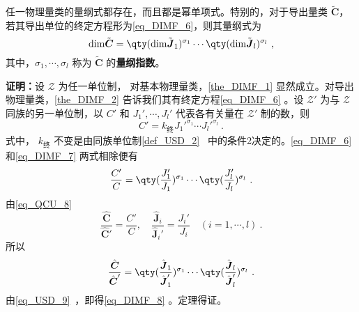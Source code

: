 \begin{theorem}{}\label{the_DIMF_1}
任一物理量类的量纲式都存在，而且都是幂单项式。特别的，对于导出量类 $\tilde{\boldsymbol{C}}$，若其导出单位的终定方程形为\autoref{eq_DIMF_6}，则其量纲式为
\begin{equation}\label{eq_DIMF_8}
\mathrm{dim}\tilde{\boldsymbol{C}}=\qty(\mathrm{dim}\tilde{\boldsymbol{J}}_1)^{\sigma_1}\cdots\qty(\mathrm{dim}\tilde{\boldsymbol{J}}_l)^{\sigma_l}~,
\end{equation}
其中，$\sigma_1,\cdots,\sigma_l$ 称为 $\tilde{\boldsymbol{C}}$ 的\textbf{量纲指数}。
\end{theorem}
\textbf{证明：}设 $\mathscr{Z}$ 为任一单位制， 对基本物理量类，\autoref{the_DIMF_1} 显然成立。对导出物理量类，\autoref{the_DIMF_2} 告诉我们其有终定方程\autoref{eq_DIMF_6} 。设 $\mathscr{Z'}$ 为与 $\mathscr{Z}$ 同族的另一单位制，以 $C'$ 和 $J_1',\cdots,J_l'$ 代表各有关量在 $\mathscr{Z'}$ 制的数，则
\begin{equation}\label{eq_DIMF_7}
C'=k_{\text{终}}J_1'^{\sigma_1}\cdots J_l'^{\sigma_l}~.
\end{equation}
 式中， $k_{\text{终}}$ 不变是由同族单位制\autoref{def_USD_2}~ 中的条件2决定的。\autoref{eq_DIMF_6} 和\autoref{eq_DIMF_7} 两式相除便有
 \begin{equation}
 \frac{C'}{C}=\qty(\frac{J_1'}{J_1})^{\sigma_1}\cdots\qty(\frac{J_l'}{J_l})^{\sigma_l}~.
 \end{equation}
 由\autoref{eq_QCU_8}~
 \begin{equation}
 \frac{\hat{\boldsymbol{C}}}{\hat{\boldsymbol{C}}'}=\frac{C'}{C}, \quad\frac{\hat{\boldsymbol{J}}_i}{\hat{\boldsymbol{J}}_i'}=\frac{J_i'}{J_i}\quad (i=1,\cdots ,l)~.
 \end{equation}
 所以
 \begin{equation}
 \frac{\hat{\boldsymbol{C}}}{\hat{\boldsymbol{C}}'}=\qty(\frac{\hat{\boldsymbol{J}}_1}{\hat{\boldsymbol{J}}_1'})^{\sigma_1}\cdots\qty(\frac{\hat{\boldsymbol{J}}_l}{\hat{\boldsymbol{J}}_l'})^{\sigma_l}~.
 \end{equation}
 由\autoref{eq_USD_9}~，即得\autoref{eq_DIMF_8} 。定理得证。

